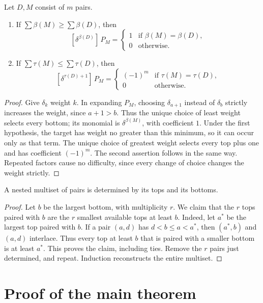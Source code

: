 \documentclass[11pt]{amsart}
\newcommand{\tops}{\tau}
\newcommand{\bots}{\beta}
\newcommand{\coef}[2]{[\delta^{#1}]\,#2}
\begin{document}
\begin{lemma}\label{lem:monomials}
Let $D,M$ consist of $m$ pairs.
\begin{enumerate}
\item If $\sum\bots(M)\ge\sum\bots(D)$, then
\[
 \coef{\bots(D)}{P_M}=
 \begin{cases}1&\text{if }\bots(M)=\bots(D),\\0&\text{otherwise.}\end{cases}
\]
\item If $\sum\tops(M)\le\sum\tops(D)$, then
\[
 \coef{\tops(D)+1}{P_M}=
 \begin{cases}(-1)^m&\text{if }\tops(M)=\tops(D),\\0&\text{otherwise.}\end{cases}
\]
\end{enumerate}
\end{lemma}
\begin{proof}
Give $\delta_k$ weight $k$. In expanding $P_M$, choosing
$\delta_{a+1}$ instead of $\delta_b$ strictly increases the weight,
since $a+1>b$. Thus the unique choice of least weight selects every
bottom; its monomial is $\delta^{\bots(M)}$, with coefficient $1$.
Under the first hypothesis, the target has weight no greater than this
minimum, so it can occur only as that term. The unique choice of
greatest weight selects every top plus one and has coefficient
$(-1)^m$. The second assertion follows in the same way. Repeated
factors cause no difficulty, since every change of choice changes the
weight strictly.
\end{proof}

\begin{lemma}[Reconstruction]\label{lem:reconstruction}
A nested multiset of pairs is determined by its tops and its bottoms.
\end{lemma}
\begin{proof}
Let $b$ be the largest bottom, with multiplicity $r$. We claim that the
$r$ tops paired with $b$ are the $r$ smallest available tops at least
$b$. Indeed, let $a^*$ be the largest top paired with $b$. If a pair
$(a,d)$ has $d<b\le a<a^*$, then $(a^*,b)$ and $(a,d)$ interlace.
Thus every top at least $b$ that is paired with a smaller bottom is
at least $a^*$. This proves the claim, including ties.
Remove the $r$ pairs just determined, and repeat. Induction reconstructs
the entire multiset.
\end{proof}

\section{Proof of the main theorem}
\end{document}
